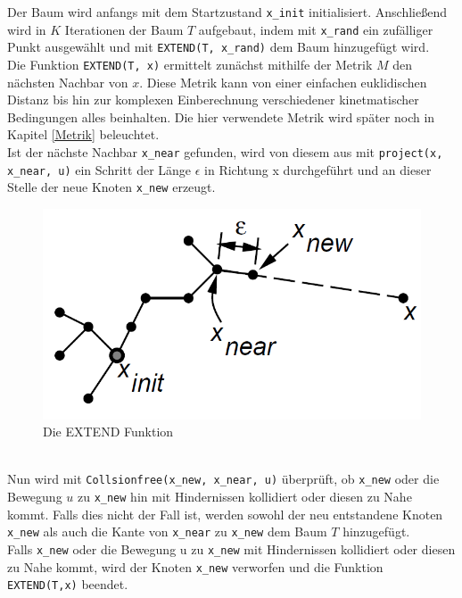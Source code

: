 Der Baum wird anfangs mit dem Startzustand \verb|x_init| initialisiert. Anschließend wird in $K$ Iterationen der Baum $T$ aufgebaut, indem mit \verb|x_rand| ein zufälliger Punkt ausgewählt und mit \verb|EXTEND(T, x_rand)| dem Baum hinzugefügt wird. \\
Die Funktion \verb|EXTEND(T, x)| ermittelt zunächst mithilfe der Metrik $M$ den nächsten Nachbar von $x$. Diese Metrik kann von einer einfachen euklidischen Distanz bis hin zur komplexen Einberechnung verschiedener kinetmatischer Bedingungen alles beinhalten. Die hier verwendete Metrik wird später noch in Kapitel \ref{Metrik} beleuchtet. \\
Ist der nächste Nachbar \verb|x_near| gefunden, wird von diesem aus mit \verb|project(x, x_near, u)|  ein Schritt der Länge  $\epsilon$ in Richtung x durchgeführt und an dieser Stelle der neue Knoten \verb|x_new| erzeugt. 
\begin{figure}
\centering
\includegraphics[scale=0.5]{Bilder/Extend.png} 
\caption{Die EXTEND Funktion \citep{Lav00} }
\label{fig3}
\end{figure} \\
Nun wird mit \verb|Collsionfree(x_new, x_near, u)| überprüft, ob \verb|x_new| oder die Bewegung $u$ zu \verb|x_new| hin mit Hindernissen kollidiert oder diesen zu Nahe kommt. Falls dies nicht der Fall ist, werden sowohl der neu entstandene Knoten \verb|x_new| als auch die Kante von \verb|x_near| zu \verb|x_new| dem Baum $T$ hinzugefügt. \\
Falls  \verb|x_new| oder die Bewegung u zu  \verb|x_new| mit Hindernissen kollidiert oder diesen zu Nahe kommt, wird der Knoten  \verb|x_new| verworfen und die Funktion \verb|EXTEND(T,x)| beendet.\\

